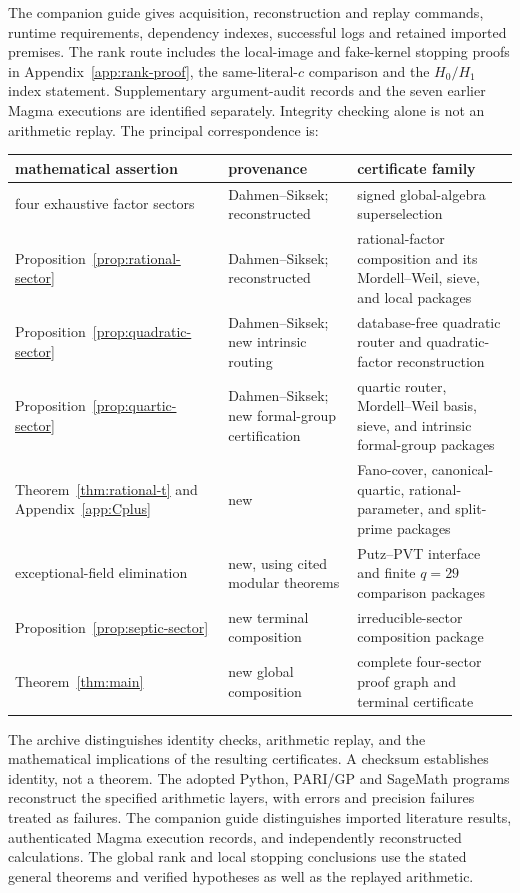 \documentclass[11pt]{article}
\theoremstyle{definition}
\theoremstyle{remark}
\begin{document}
The companion guide gives acquisition, reconstruction and replay
commands, runtime requirements, dependency indexes, successful logs and
retained imported premises. The rank route includes the local-image
and fake-kernel stopping proofs in Appendix~\ref{app:rank-proof},
the same-literal-$c$ comparison and the $H_0/H_1$ index statement.
Supplementary argument-audit records and the seven earlier Magma
executions are identified separately. Integrity checking alone is not
an arithmetic replay.
The principal correspondence is:
\begin{center}
\begin{tabular}{@{}>{\raggedright\arraybackslash}p{}
                    >{\raggedright\arraybackslash}p{}
                    >{\raggedright\arraybackslash}p{}@{}}
\toprule
mathematical assertion & provenance & certificate family\\
\midrule
four exhaustive factor sectors
  & Dahmen--Siksek; reconstructed
  & signed global-algebra superselection\\
Proposition~\ref{prop:rational-sector}
  & Dahmen--Siksek; reconstructed
  & rational-factor composition and its Mordell--Weil, sieve, and local packages\\
Proposition~\ref{prop:quadratic-sector}
  & Dahmen--Siksek; new intrinsic routing
  & database-free quadratic router and quadratic-factor reconstruction\\
Proposition~\ref{prop:quartic-sector}
  & Dahmen--Siksek; new formal-group certification
  & quartic router, Mordell--Weil basis, sieve, and intrinsic formal-group packages\\
Theorem~\ref{thm:rational-t} and Appendix~\ref{app:Cplus}
  & new
  & Fano-cover, canonical-quartic, rational-parameter, and split-prime packages\\
exceptional-field elimination
  & new, using cited modular theorems
  & Putz--PVT interface and finite $q=29$ comparison packages\\
Proposition~\ref{prop:septic-sector}
  & new terminal composition
  & irreducible-sector composition package\\
Theorem~\ref{thm:main}
  & new global composition
  & complete four-sector proof graph and terminal certificate\\
\bottomrule
\end{tabular}
\end{center}
The archive distinguishes identity checks, arithmetic replay, and the
mathematical implications of the resulting certificates.  A checksum
establishes identity, not a theorem.  The adopted Python, PARI/GP and
SageMath programs reconstruct the specified arithmetic layers, with errors
and precision failures treated as failures.  The companion guide
distinguishes imported literature results, authenticated Magma execution
records, and independently reconstructed calculations.
The global rank and local stopping conclusions use the stated general
theorems and verified hypotheses as well as the replayed arithmetic.
\end{document}

